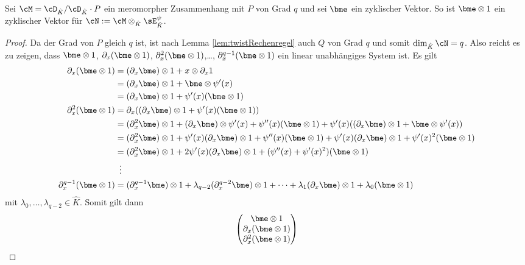\begin{comment}
\cite[Chap 5 §2]{coutinho1995primer}
\end{comment}
\begin{lem}
Sei $\cM=\cD_{\hat K}/\cD_{\hat K}\cdot P$ ein meromorpher Zusammenhang mit $P$
von Grad $q$ und sei $\bme$ ein zyklischer Vektor. So ist $\bme\otimes1$ ein
zyklischer Vektor für $\cN:=\cM\otimes_{\hat K}\sE_{\hat K}^\psi$.
\end{lem}
\begin{proof}
Da der Grad von $P$ gleich $q$ ist, ist nach Lemma \ref{lem:twistRechenregel}
auch $Q$ von Grad $q$ und somit $\dim_{\hat K}\cN= q$.
Also reicht es zu zeigen, dass $\bme\otimes 1$, $\partial_x(\bme\otimes 1)$,
$\partial_x^2(\bme\otimes 1)$,\dots, $\partial_x^{q-1}(\bme\otimes 1)$ ein
linear unabhängiges System ist.  Es gilt
\begin{align*}
\partial_x(\bme\otimes 1) &= (\partial_x \bme)\otimes 1 + x\otimes \partial_x 1\\
  &= (\partial_x \bme)\otimes 1 + \bme\otimes \psi'(x)\\
  &= (\partial_x \bme)\otimes 1 +  \psi'(x)(\bme\otimes 1)\\
\partial_x^2(\bme\otimes 1) &= \partial_x((\partial_x \bme)\otimes 1 +
    \psi'(x)(\bme\otimes 1))\\
  &= (\partial_x^2 \bme)\otimes 1 + (\partial_x \bme)\otimes \psi'(x)
  + \psi''(x)(\bme\otimes 1)
  + \psi'(x)((\partial_x \bme)\otimes 1 + \bme\otimes \psi'(x))\\
  &= (\partial_x^2 \bme)\otimes 1
  + \psi'(x)(\partial_x \bme)\otimes 1
  + \psi''(x)(\bme\otimes 1)
  + \psi'(x)(\partial_x \bme)\otimes 1
  + \psi'(x)^2(\bme\otimes 1)\\
  &= (\partial_x^2 \bme)\otimes 1
  + 2\psi'(x)(\partial_x \bme)\otimes 1
  + (\psi''(x) + \psi'(x)^2)(\bme\otimes 1)\\
  &\,\,\,\vdots\\
\partial_x^{q-1}(\bme\otimes 1) &= (\partial_x^{q-1} \bme)\otimes 1
  + \lambda_{q-2}(\partial_x^{q-2} \bme)\otimes 1
  +\dots
  + \lambda_{1}(\partial_x \bme)\otimes 1
  + \lambda_0(\bme\otimes 1)\\
\end{align*}
mit $\lambda_0,\dots,\lambda_{q-2}\in \hat K$.
Somit gilt dann
\[
\begin{pmatrix}
\bme\otimes 1\\
\partial_x(\bme\otimes 1)\\
\partial_x^2(\bme\otimes 1)\\

\end{pmatrix}\]
\end{proof}
